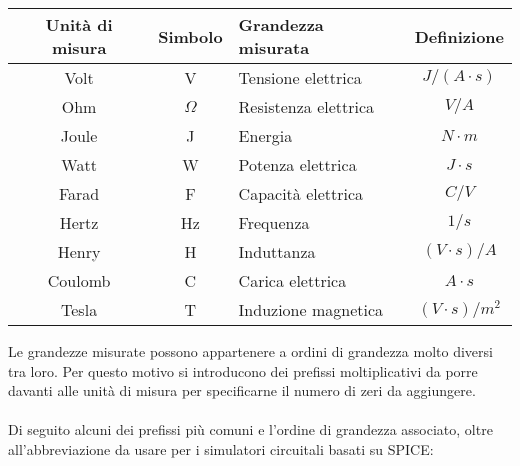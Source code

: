 \documentclass{article}
\begin{document}
\begin{center}
\begin{tabular}{|c|c|p{6cm}|c|}
\hline
\textbf{Unità di misura} & \textbf{Simbolo} & \textbf{Grandezza misurata} & \textbf{Definizione}\\
\hline
Volt & V & Tensione elettrica & $J/(A\cdot s)$\\
Ohm & $\Omega$ & Resistenza elettrica & $V/A$\\
Joule & J & Energia & $N\cdot m$\\
Watt & W & Potenza elettrica & $J\cdot s$\\
Farad & F & Capacità elettrica & $C/V$\\
Hertz & Hz & Frequenza & $1/s$ \\
Henry & H & Induttanza & $(V\cdot s)/A$\\
Coulomb & C & Carica elettrica & $A\cdot s$\\
Tesla & T & Induzione magnetica & $(V\cdot s)/m^2$\\
\hline
\end{tabular}
\end{center}
Le grandezze misurate possono appartenere a ordini di grandezza molto diversi tra loro. Per questo motivo si introducono dei prefissi moltiplicativi da porre davanti alle unità di misura per specificarne il numero di zeri da aggiungere.\\\\
Di seguito alcuni dei prefissi più comuni e l'ordine di grandezza associato, oltre all'abbreviazione da usare per i simulatori circuitali basati su SPICE:
\end{document}
